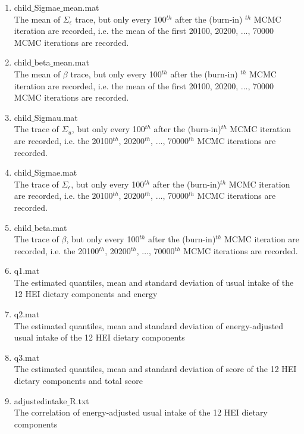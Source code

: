 \documentclass[12pt]{article}
\def\th{^{th}}
\begin{document}
\begin{itemize}
\begin{enumerate}
\item	child$\_$Sigmae$\_$mean.mat \\
The mean of $\Sigma_{\epsilon}$ trace, but only every 100$\th$ after the (burn-in) $\th$ MCMC iteration are recorded, i.e. the mean of the first 20100, 20200, $\ldots$, 70000 MCMC iterations are recorded. 

\item	child$\_$beta$\_$mean.mat    \\
The mean of $\beta$ trace, but only every 100$\th$ after the (burn-in) $\th$ MCMC iteration are recorded, i.e. the mean of the first 20100, 20200, $\ldots$, 70000 MCMC iterations are recorded.

\item	child$\_$Sigmau.mat \\
The trace of $\Sigma_u$, but only every 100$\th$ after the (burn-in)$\th$ MCMC iteration are recorded, i.e. the 20100$\th$, 20200$\th$, $\ldots$, 70000$\th$ MCMC iterations are recorded. 

\item	child$\_$Sigmae.mat\\
The trace of $\Sigma_{\epsilon}$, but only every 100$\th$ after the (burn-in)$\th$ MCMC iteration are recorded, i.e. the 20100$\th$, 20200$\th$, $\ldots$, 70000$\th$ MCMC iterations are recorded. 

\item	child$\_$beta.mat   \\
The trace of $\beta$, but only every 100$\th$ after the (burn-in)$\th$ MCMC iteration are recorded, i.e. the 20100$\th$, 20200$\th$, $\ldots$, 70000$\th$ MCMC iterations are recorded. 

\item	q1.mat\\
The estimated quantiles, mean and standard deviation of usual intake of the 12 HEI dietary components and energy
 
\item	q2.mat\\
The estimated quantiles, mean and standard deviation of energy-adjusted usual intake of the 12 HEI dietary components

\item	q3.mat\\
The estimated quantiles, mean and standard deviation of score of the 12 HEI dietary components and total score

\item	 adjustedintake$\_$R.txt\\
The correlation of energy-adjusted usual intake of the 12 HEI dietary components


\end{enumerate}
\end{itemize}
\end{document}
